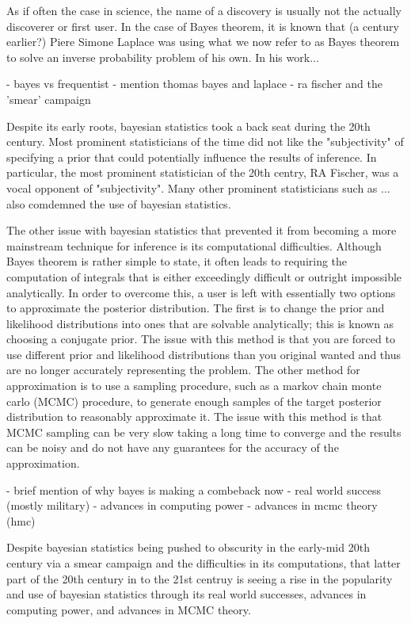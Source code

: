 As if often the case in science, the name of a discovery is usually not the actually discoverer or first user. In the case of Bayes theorem, it is known that (a century earlier?) Piere Simone Laplace was using what we now refer to as Bayes theorem to solve an inverse probability problem of his own. In his work...


- bayes vs frequentist
	- mention thomas bayes and laplace
	- ra fischer and the 'smear' campaign
	
Despite its early roots, bayesian statistics took a back seat during the 20th century. Most prominent statisticians of the time did not like the "subjectivity" of specifying a prior that could potentially influence the results of inference. In particular, the most prominent statistician of the 20th centry, RA Fischer, was a vocal opponent of "subjectivity". Many other prominent statisticians such as ... also comdemned the use of bayesian statistics.

The other issue with bayesian statistics that prevented it from becoming a more mainstream technique for inference is its computational difficulties. Although Bayes theorem is rather simple to state, it often leads to requiring the computation of integrals that is either exceedingly difficult or outright impossible analytically. In order to overcome this, a user is left with essentially two options to approximate the posterior distribution. The first is to change the prior and likelihood distributions into ones that are solvable analytically; this is known as choosing a conjugate prior. The issue with this method is that you are forced to use different prior and likelihood distributions than you original wanted and thus are no longer accurately representing the problem. The other method for approximation is to use a sampling procedure, such as a markov chain monte carlo (MCMC) procedure, to generate enough samples of the target posterior distribution to reasonably approximate it. The issue with this method is that MCMC sampling can be very slow taking a long time to converge and the results can be noisy and do not have any guarantees for the accuracy of the approximation.
	
- brief mention of why bayes is making a combeback now
	- real world success (mostly military)
	- advances in computing power
	- advances in mcmc theory (hmc)

Despite bayesian statistics being pushed to obscurity in the early-mid 20th century via a smear campaign and the difficulties in its computations, that latter part of the 20th century in to the 21st centruy is seeing a rise in the popularity and use of bayesian statistics through its real world successes, advances in computing power, and advances in MCMC theory.

